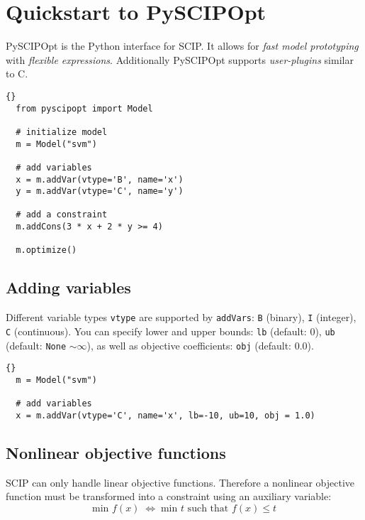 \documentclass[11pt]{article}
\newcommand\ttt\texttt
\begin{document}
\section*{Quickstart to PySCIPOpt}

PySCIPOpt is the Python interface for SCIP.
It allows for \emph{fast model prototyping} with \emph{flexible expressions}.
Additionally PySCIPOpt supports \emph{user-plugins} similar to C.

\begin{lstlisting}[frame=tb]{}
  from pyscipopt import Model

  # initialize model
  m = Model("svm")

  # add variables
  x = m.addVar(vtype='B', name='x')
  y = m.addVar(vtype='C', name='y')

  # add a constraint
  m.addCons(3 * x + 2 * y >= 4)

  m.optimize()
\end{lstlisting}

\subsection*{Adding variables}

Different variable types \ttt{vtype} are supported by \ttt{addVars}: \ttt{B} (binary), \ttt{I} (integer), \ttt{C} (continuous).
You can specify lower and upper bounds: \ttt{lb} (default: 0), \ttt{ub} (default: \ttt{None} $\sim \infty$), as well as objective coefficients: \ttt{obj} (default: $0.0$).


\begin{lstlisting}[frame=tb]{}
  m = Model("svm")

  # add variables
  x = m.addVar(vtype='C', name='x', lb=-10, ub=10, obj = 1.0)
\end{lstlisting}

\clearpage
\subsection*{Nonlinear objective functions}
SCIP can only handle linear objective functions.
Therefore a nonlinear objective function must be transformed into a constraint using an auxiliary variable:
$$ \text{min } f(x) \; \Leftrightarrow \; \text{min } t \text{ such that } f(x) \leq t $$
\end{document}
